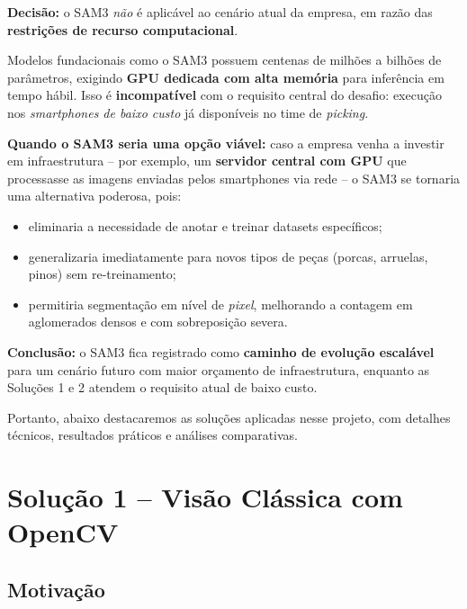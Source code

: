 \documentclass[12pt,a4paper]{article}
\begin{document}
\begin{tcolorbox}[veredicto={Por que o SAM3 N\~AO foi adotado neste projeto}]
\textbf{Decis\~ao:} o SAM3 \emph{n\~ao} \'e aplic\'avel ao cen\'ario atual da empresa,
em raz\~ao das \textbf{restri\c{c}\~oes de recurso computacional}.

\medskip
Modelos fundacionais como o SAM3 possuem centenas de milh\~oes a bilh\~oes de
par\^ametros, exigindo \textbf{GPU dedicada com alta mem\'oria} para infer\^encia em
tempo h\'abil. Isso \'e \textbf{incompat\'ivel} com o requisito central do desafio:
execu\c{c}\~ao nos \emph{smartphones de baixo custo} j\'a dispon\'iveis no time de
\emph{picking}.

\medskip
\textbf{Quando o SAM3 seria uma op\c{c}\~ao vi\'avel:} caso a empresa venha a investir
em infraestrutura -- por exemplo, um \textbf{servidor central com GPU} que processasse
as imagens enviadas pelos smartphones via rede -- o SAM3 se tornaria uma alternativa
poderosa, pois:
\begin{itemize}[leftmargin=*, noitemsep]
  \item eliminaria a necessidade de anotar e treinar datasets espec\'ificos;
  \item generalizaria imediatamente para novos tipos de pe\c{c}as (porcas, arruelas,
        pinos) sem re-treinamento;
  \item permitiria segmenta\c{c}\~ao em n\'ivel de \emph{pixel}, melhorando a contagem
        em aglomerados densos e com sobreposi\c{c}\~ao severa.
\end{itemize}

\medskip
\textbf{Conclus\~ao:} o SAM3 fica registrado como \textbf{caminho de evolu\c{c}\~ao
escal\'avel} para um cen\'ario futuro com maior or\c{c}amento de infraestrutura,
enquanto as Solu\c{c}\~oes 1 e 2 atendem o requisito atual de baixo custo.
\end{tcolorbox}

Portanto, abaixo destacaremos as soluções aplicadas nesse projeto, com detalhes técnicos, resultados práticos e análises comparativas.

\section{Solu\c{c}\~ao 1 -- Vis\~ao Cl\'assica com OpenCV}
\label{sec:sol1}

\subsection{Motiva\c{c}\~ao}
\end{document}
